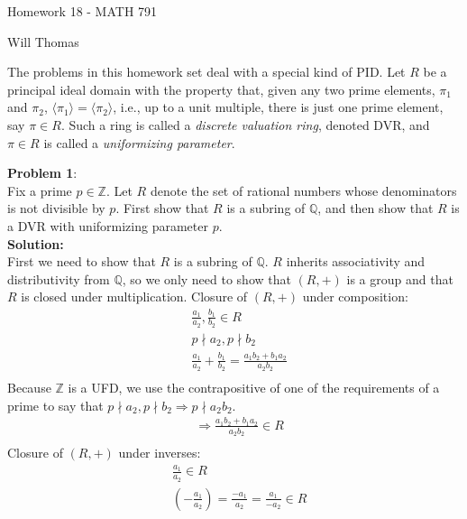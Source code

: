 \documentclass[11pt]{article}
\newcommand{\prob}[3]{\begin{flushleft}
        \textbf{Problem #1}: \\
        #2 
		\textbf{Solution:} 
		#3

\end{flushleft}}
\newcommand{\B}[1]{%
	\mathbb{#1}
}
\newcommand{\makeHWtitle}[1]{
    \begin{center}
    \Large{Homework #1 - MATH 791} 
        \vspace{5pt}
        
        \normalsize{Will Thomas}
        \vspace{5pt}
    \end{center}
}
\begin{document}
\makeHWtitle{18}

The problems in this homework set deal with a special kind of PID.
Let $R$ be a principal ideal domain with the property that, given any two prime elements, $\pi_1$ and $\pi_2$, $\langle \pi_1 \rangle = \langle \pi_2 \rangle$, i.e., up to a unit multiple, there is just one prime element, say $\pi \in R$.
Such a ring is called a \emph{discrete valuation ring}, denoted DVR, and $\pi \in R$ is called a \emph{uniformizing parameter}.

\prob{1}{
  Fix a prime $p \in \mathbb{Z}$. Let $R$ denote the set of rational numbers whose denominators is not divisible by $p$.
  First show that $R$ is a subring of $\mathbb{Q}$, and then show that $R$ is a DVR with uniformizing parameter $p$. \\
}{ \\
  First we need to show that $R$ is a subring of $\mathbb{Q}$. $R$ inherits associativity and distributivity from $\mathbb{Q}$, so we only need to show that $(R, +)$ is a group and that $R$ is closed under multiplication.
  \newline
  Closure of $(R, +)$ under composition:
  \begin{align*}
     & \frac{a_1}{a_2}, \frac{b_1}{b_2} \in R                            \\
     & p \nmid a_2, p \nmid b_2                                          \\
     & \frac{a_1}{a_2} + \frac{b_1}{b_2} = \frac{a_1b_2+ b_1a_2}{a_2b_2} \\
  \end{align*}
  Because $\B{Z}$ is a UFD, we use the contrapositive of one of the requirements of a prime to say that $p \nmid a_2, p \nmid b_2 \Rightarrow p \nmid a_2b_2$.
  \begin{align*}
     & \Rightarrow \frac{a_1b_2+ b_1a_2}{a_2b_2} \in R \\
  \end{align*}
  Closure of $(R, +)$ under inverses:
  \begin{align*}
     & \frac{a_1}{a_2} \in R                                                        \\
     & \left( - \frac{a_1}{a_2} \right) = \frac{-a_1}{a_2} = \frac{a_1}{-a_2} \in R \\
  \end{align*}

}
\end{document}
